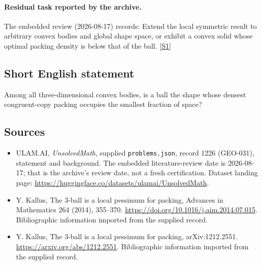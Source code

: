 \documentclass[11pt,a4paper]{article}
\newcommand{\sref}[2]{\hyperlink{source:#1:#2}{[S#2]}}
\begin{document}
\paragraph{Residual task reported by the archive.}

The embedded review (2026-08-17) records: Extend the local symmetric result to arbitrary convex bodies and global shape space, or exhibit a convex solid whose optimal packing density is below that of the ball. \sref{1226}{1}

\subsection{Short English statement}

Among all three-dimensional convex bodies, is a ball the shape whose densest congruent-copy packing occupies the smallest fraction of space?

\subsection{Sources}

{\small

\begin{itemize}

\item[\hypertarget{source:1226:1}{S1}] ULAM.AI, \emph{UnsolvedMath}, supplied \texttt{problems.json}, record 1226 (GEO-031), statement and background. The embedded literature-review date is 2026-08-17; that is the archive’s review date, not a fresh certification. Dataset landing page: \url{https://huggingface.co/datasets/ulamai/UnsolvedMath}.

\item[\hypertarget{source:1226:2}{S2}] Y. Kallus, The 3-ball is a local pessimum for packing, Advances in Mathematics 264 (2014), 355–370. \url{https://doi.org/10.1016/j.aim.2014.07.015}. Bibliographic information imported from the supplied record.

\item[\hypertarget{source:1226:3}{S3}] Y. Kallus, The 3-ball is a local pessimum for packing, arXiv:1212.2551. \url{https://arxiv.org/abs/1212.2551}. Bibliographic information imported from the supplied record.

\end{itemize}

}

\label{end:1226}
\end{document}
